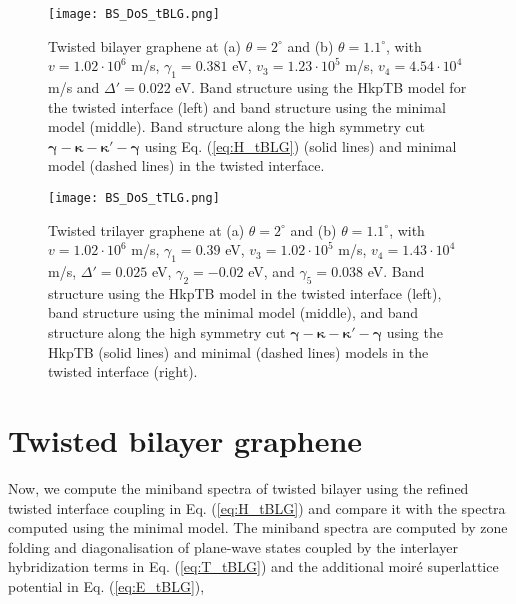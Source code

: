 \documentclass[showpacs,aps,prb,reprint,twocolumn]{revtex4-1}
\begin{document}
\begin{figure*}
\begin{center}
\texttt{[image: BS\_DoS\_tBLG.png]}
\caption{Twisted bilayer graphene at (a) $\theta=2^\circ$ and (b) $\theta=1.1^\circ$, with $v=1.02\cdot10^6$ m/s, $\gamma_1=0.381$ eV, $v_3=1.23\cdot10^5$ m/s, $v_4=4.54\cdot10^4$ m/s and $\Delta'=0.022$ eV\cite{Kuzmenko_2009}. Band structure using the HkpTB model for the twisted interface (left) and band structure using the minimal model \cite{Lopes_2007,Bistritzer_2011}(middle). Band structure along the high symmetry cut $\boldsymbol{\gamma-\kappa-\kappa'-\gamma}$ using Eq. (\ref{eq:H_tBLG}) (solid lines) and minimal model (dashed lines) in the twisted interface. \label{fig:tBLG}}
\end{center}
\end{figure*}
\begin{figure*}
\begin{center}
\texttt{[image: BS\_DoS\_tTLG.png]}
\caption{Twisted trilayer graphene at (a) $\theta=2^\circ$ and (b) $\theta=1.1^\circ$, with $v=1.02\cdot10^6$ m/s, $\gamma_1=0.39$ eV, $v_3=1.02\cdot10^5$ m/s, $v_4=1.43\cdot10^4$ m/s, $\Delta'=0.025$ eV, $\gamma_2=-0.02$ eV, and $\gamma_5=0.038$ eV\cite{Dresselhaus_2002}. Band structure using the HkpTB model in the twisted interface (left), band structure using the minimal model (middle), and band structure along the high symmetry cut $\boldsymbol{\gamma-\kappa-\kappa'-\gamma}$ using the HkpTB (solid lines) and minimal (dashed lines) models in the twisted interface (right). \label{fig:tTLG}}
\end{center}
\end{figure*}


\section{Twisted bilayer graphene}
\label{sec:dispersion_tblg}
Now, we compute the miniband spectra of twisted bilayer using the refined twisted interface coupling in Eq. (\ref{eq:H_tBLG}) and compare it with the spectra computed using the minimal model. The miniband spectra are computed by zone folding and diagonalisation of plane-wave states coupled by the interlayer hybridization terms in Eq. (\ref{eq:T_tBLG}) and the additional moir\'{e} superlattice potential in Eq. (\ref{eq:E_tBLG}),
\end{document}
